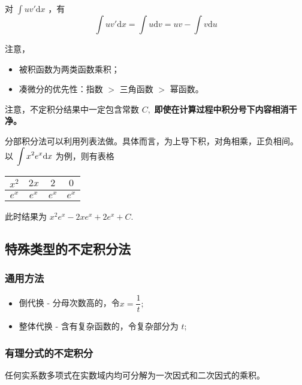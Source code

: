 \begin{Field}[分部积分法]

    对 $ \int uv'\mathrm{d}x $ ，有$$
        \int uv'\mathrm{d}x = \int u\mathrm{d}v=uv-\int v\mathrm{d}u
    $$ 
\end{Field}

注意，\begin{itemize}
    \item 被积函数为两类函数乘积；
    \item 凑微分的优先性：指数 $ > $ 三角函数 $ > $ 幂函数。
\end{itemize}

注意，不定积分结果中一定包含常数 $ C, $ \textbf{即使在计算过程中积分号下内容相消干净。}

分部积分法可以利用列表法做。具体而言，为上导下积，对角相乘，正负相间。
以 $ \displaystyle \int x^2e^x \mathrm{d}x $ 为例，则有表格

\begin{center}
    \begin{tabular}{c|ccc}
        $ x^2 $ & $ 2x $ & $ 2 $ & $ 0 $ \\\hline 
        $ e^x $ &$ e^x $ &$ e^x $ &$ e^x $ 
    \end{tabular}    
\end{center}
    
此时结果为  $ x^2 e^x - 2x e^x + 2 e^x + C. $ 

\subsection{特殊类型的不定积分法}

\subsubsection{通用方法}

\begin{itemize}
    \item 倒代换 - 分母次数高的，令$ x = \dfrac{1}{t}; $ 
    \item 整体代换 - 含有复杂函数的，令复杂部分为 $ t; $
\end{itemize}

\subsubsection{有理分式的不定积分}

\begin{Theo}[]

    任何实系数多项式在实数域内均可分解为一次因式和二次因式的乘积。
\end{Theo}

